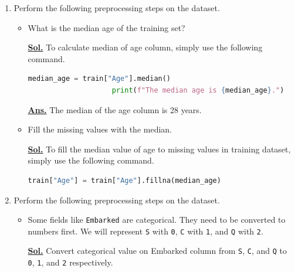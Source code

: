 \documentclass[12pt, a4paper]{article}
\newcommand{\sol}{\par\noindent\underline{\textbf{Sol.}} }
\newcommand{\ans}{\par\noindent\underline{\textbf{Ans.}} }
\begin{document}
    \begin{enumerate}
        \item[\textbf{T8.}] Perform the following preprocessing steps on the dataset.

            \begin{itemize}
                \item[\textbf{T8.1.}] What is the median age of the training set?

                \sol To calculate median of age column, simply use the following command.

                \begin{lstlisting}[language=Python, caption=Calculate median value of the age column, gobble=20]
                    median_age = train["Age"].median()
                    print(f"The median age is {median_age}.")
                \end{lstlisting}

                \ans The median of the age column is 28 years.

                \item[\textbf{T8.2.}] Fill the missing values with the median.

                \sol To fill the median value of age to missing values in training dataset, simply use the following command.

                \begin{lstlisting}[language=Python, caption=Fill missing age value with median value, gobble=20]
                    train["Age"] = train["Age"].fillna(median_age)
                \end{lstlisting}

            \end{itemize}
    \pagebreak

        \item[\textbf{T9.}] Perform the following preprocessing steps on the dataset.

            \begin{itemize}
                \item[\textbf{T9.1.}] Some fields like \texttt{Embarked} are categorical. They need to be converted to numbers first. We will represent \texttt{S} with \texttt{0}, \texttt{C} with \texttt{1}, and \texttt{Q} with \texttt{2}.

                \sol Convert categorical value on Embarked column from \texttt{S}, \texttt{C}, and \texttt{Q} to \texttt{0}, \texttt{1}, and \texttt{2} respectively.


\end{itemize}
\end{enumerate}
\end{document}
